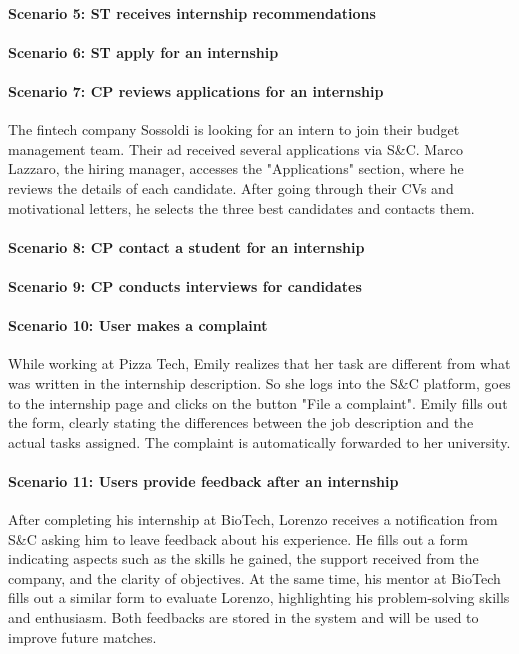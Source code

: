 \paragraph{Scenario 5: ST receives internship recommendations}

\paragraph{Scenario 6: ST apply for an internship}

\paragraph{Scenario 7: CP reviews applications for an internship}
The fintech company Sossoldi is looking for an intern to join their budget management team. Their ad received several applications via S\&C. Marco Lazzaro, the hiring manager, accesses the "Applications" section, where he reviews the details of each candidate. After going through their CVs and motivational letters, he selects the three best candidates and contacts them.

\paragraph{Scenario 8: CP contact a student for an internship}

\paragraph{Scenario 9: CP conducts interviews for candidates}

\paragraph{Scenario 10: User makes a complaint}
While working at Pizza Tech, Emily realizes that her task are different from what was written in the internship description. So she logs into the S\&C platform, goes to the internship page and clicks on the button "File a complaint". Emily fills out the form, clearly stating the differences between the job description and the actual tasks assigned. The complaint is automatically forwarded to her university.

\paragraph{Scenario 11: Users provide feedback after an internship}
After completing his internship at BioTech, Lorenzo receives a notification from S\&C asking him to leave feedback about his experience. He fills out a form indicating aspects such as the skills he gained, the support received from the company, and the clarity of objectives. At the same time, his mentor at BioTech fills out a similar form to evaluate Lorenzo, highlighting his problem-solving skills and enthusiasm. Both feedbacks are stored in the system and will be used to improve future matches.

